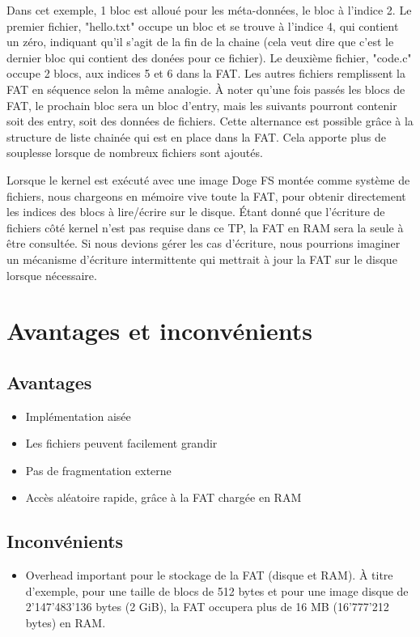 \documentclass[a4paper, 12pt]{article}
\begin{document}
Dans cet exemple, 1 bloc est alloué pour les méta-données, le bloc à l'indice 2. 
Le premier fichier, "hello.txt" occupe un bloc et se trouve à l'indice 4, qui contient un zéro, indiquant 
qu'il s'agit de la fin de la chaine (cela veut dire que c'est le dernier bloc qui contient des donées pour
ce fichier). Le deuxième fichier, "code.c" occupe 2 blocs, aux indices 5 et 6 dans la FAT.
Les autres fichiers remplissent la FAT en séquence selon la même analogie.
À noter qu'une fois passés les blocs de FAT, le prochain bloc sera un bloc d'entry, mais les suivants pourront
contenir soit des entry, soit des données de fichiers. Cette alternance est possible grâce à la structure 
de liste chainée qui est en place dans la FAT. Cela apporte plus de souplesse lorsque de nombreux fichiers 
sont ajoutés.
\bigbreak

Lorsque le kernel est exécuté avec une image Doge FS montée comme système de fichiers, nous chargeons en 
mémoire vive toute la FAT, pour obtenir directement les indices des blocs à lire/écrire sur le disque. Étant 
donné que l'écriture de fichiers côté kernel n'est pas requise dans ce TP, la FAT en RAM sera la seule à être 
consultée. Si nous devions gérer les cas d'écriture, nous pourrions imaginer un mécanisme d'écriture intermittente
qui mettrait à jour la FAT sur le disque lorsque nécessaire.

\section{Avantages et inconvénients}
\subsection{Avantages}
\begin{itemize}
	\item Implémentation aisée
	\item Les fichiers peuvent facilement grandir
	\item Pas de fragmentation externe
	\item Accès aléatoire rapide, grâce à la FAT chargée en RAM
\end{itemize}
\subsection{Inconvénients}
\begin{itemize}
	\item Overhead important pour le stockage de la FAT (disque et RAM). À titre d'exemple, pour une taille de 
	blocs de 512 bytes et pour une image disque de 2'147'483'136 bytes (2 GiB), la FAT occupera plus de 16 MB 
	(16'777'212 bytes) en RAM.
\end{itemize}
\end{document}
